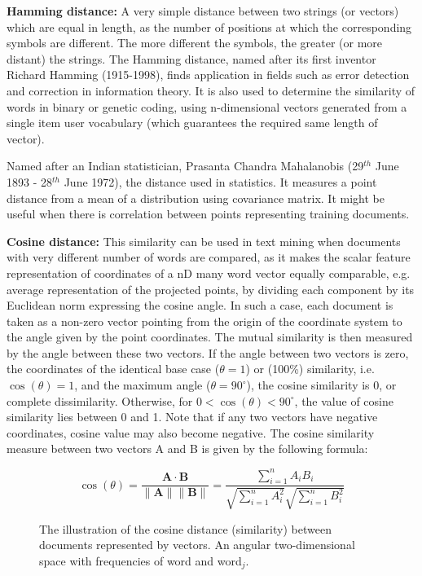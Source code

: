 \documentclass[11pt,openany,executivepaper]{book}
\begin{document}
\textbf{Hamming distance:} A very simple distance between two strings (or vectors)
which are equal in length, as the number of positions at which the corresponding
symbols are different. The more different the symbols, the greater (or more distant) the strings.
The Hamming distance, named after its first inventor Richard Hamming (1915-1998),
finds application in fields such as error detection and correction in information theory.
It is also used to determine the similarity of words in binary or genetic coding,
using n-dimensional vectors generated from a single item user vocabulary (which
guarantees the required same length of vector).

Named after an Indian statistician, Prasanta Chandra Mahalanobis (29$^{th}$ June 1893 - 28$^{th}$ June 1972), 
the distance used in statistics. It measures a point distance from a mean of a distribution using covariance matrix.
It might be useful when there is correlation between points representing training documents.

\textbf{Cosine distance:}
This similarity can be used in text mining when documents with very different number of words are compared,
as it makes the scalar feature representation of coordinates of a nD many word vector equally comparable,
e.g. average representation of the projected points, by dividing each component by its Euclidean norm expressing
the cosine angle. In such a case, each document is taken as a non-zero vector pointing from the origin of the coordinate system
to the angle given by the point coordinates. The mutual similarity is then measured by the angle between these two vectors.
If the angle between two vectors is zero, the coordinates of the identical base case ($\theta = 1$) or (100\%) similarity,
i.e. $\cos(\theta) = 1$, and the maximum angle ($\theta = 90^\circ$), the cosine similarity is 0, or complete dissimilarity.
Otherwise, for $0 < \cos(\theta) < 90^\circ$, the value of cosine similarity lies between 0 and 1.
Note that if any two vectors have negative coordinates, cosine value may also become negative.
The cosine similarity measure between two vectors A and B is given by the following formula:

\begin{equation}
\cos(\theta) = \frac{\mathbf{A} \cdot \mathbf{B}}{\|\mathbf{A}\| \|\mathbf{B}\|} 
= \frac{\sum_{i=1}^{n} A_i B_i}{\sqrt{\sum_{i=1}^{n} A_i^2} \sqrt{\sum_{i=1}^{n} B_i^2}}
\tag{6.3}
\end{equation}

\begin{figure}[h!]
\centering
\caption{The illustration of the cosine distance (similarity) between documents represented by vectors.
An angular two-dimensional space with frequencies of word and word$_j$.}
\end{figure}
\end{document}
